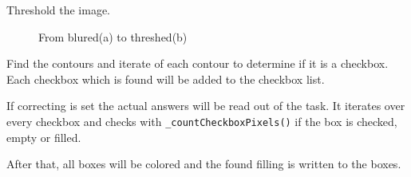 Threshold the image.

\begin{figure}[H]
    \centering
    \qquad
    \caption{From blured(a) to threshed(b)}
\end{figure}

Find the contours and iterate of each contour to determine if it is a checkbox.
Each checkbox which is found will be added to the checkbox list.

If correcting is set the actual answers will be read out of the task.
It iterates over every checkbox and checks with \texttt{\_countCheckboxPixels()} if the box is checked, empty or filled.

After that, all boxes will be colored and the found filling is written to the boxes.

